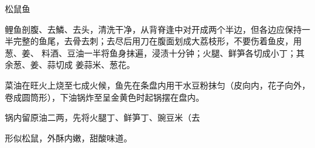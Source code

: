 \begin{recipe}{松鼠鱼}

\ingredients


\preparation

\step 鲤鱼剖腹、去鱗、去头，清洗干净，从背脊逢中对开成两个半边，但各边应保持一
半完整的鱼尾，去骨去刺；去尽后用刀在腹面划成大荔枝形，不要伤着鱼皮，用葱、姜、
料酒、豆油一半将鱼身抹遍，浸渍十分钟；火腿、鲜笋各切成小丁；其余葱、姜、蒜切成
姜蒜米、葱花。

\step 菜油在旺火上烧至七成火候，鱼先在条盘内用干水豆粉抹匀（皮向内，花子向外，
卷成圆筒形），下油锅炸至呈金黄色时起锅摆在盘内。

\step 锅内留原油二两，先将火腿丁、鲜笋丁、豌豆米（去

\features

形似松鼠，外酥内嫩，甜酸味道。

\end{recipe}

